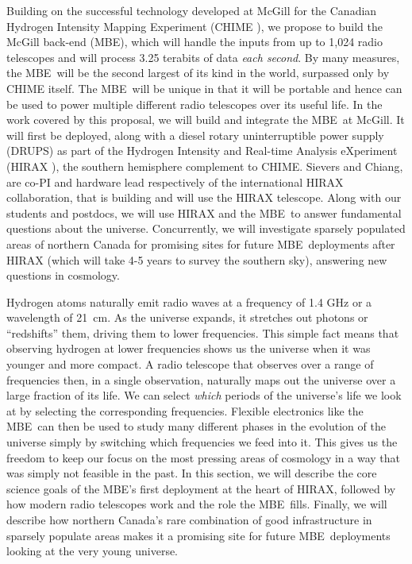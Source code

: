 \documentclass[letterpaper,11pt,preprint]{aastex}
\makeatletter
\newcommand{\mbe}{{\rm MBE}}
\def\section{\@startsection {section}{1}{\z@}{1.0ex plus 
1ex minus .2ex}{.2ex plus .2ex}{\large\bf}}
\makeatother
\begin{document}
Building on the successful technology developed at McGill for the
Canadian Hydrogen Intensity Mapping Experiment (CHIME
\citet{Bandura16}), we propose to build the McGill back-end (\mbe),
which will handle the inputs from up to 1,024 radio telescopes and
will process 3.25 terabits of data {\it{each second}}.  By many measures, the
\mbe\ will be the second largest of its kind in the world, surpassed
only by CHIME itself.  The \mbe\ will be unique in that it will be
portable and hence can be used to power multiple different radio
telescopes over its useful life. In the work covered by this proposal,
we will build and integrate the \mbe\ at McGill.  It will first be
deployed, along with a diesel rotary uninterruptible power supply
(DRUPS) as part of the Hydrogen Intensity and Real-time Analysis
eXperiment (HIRAX \citet{Newburgh16}), the southern hemisphere
complement to CHIME.
Sievers and Chiang, are co-PI and hardware lead respectively of the
international HIRAX collaboration, that is building and will use the
HIRAX telescope.  Along with our students and postdocs, we will use
HIRAX and the \mbe\ to answer fundamental questions about the
universe.
Concurrently, we will investigate sparsely populated areas of northern
Canada for promising sites for future \mbe\ deployments after HIRAX
(which will take 4-5 years to survey the southern sky),
answering new questions in cosmology.

\section{Research/Technology Development}

Hydrogen atoms naturally emit radio waves at a frequency of 1.4 GHz or
a wavelength of 21~cm.  As the universe expands, it stretches out
photons or ``redshifts'' them, driving them to lower frequencies.
This simple fact means that observing hydrogen at lower frequencies
shows us the universe when it was younger and more compact.  A radio
telescope that observes over a range of frequencies then, in a single
observation, naturally maps out the universe over a large fraction of
its life.  We can select {\it{which}} periods of the universe's life
we look at by selecting the corresponding frequencies.  Flexible
electronics like the \mbe\ can then be used to study many different
phases in the evolution of the universe simply by switching which
frequencies we feed into it.  This gives us the freedom to keep our
focus on the most pressing areas of cosmology in a way that was simply
not feasible in the past.  In this section, we will describe the core
science goals of the \mbe's first deployment at the heart of HIRAX,
followed by how modern radio telescopes work and the role the \mbe\ 
fills.  Finally, we will describe how northern Canada's rare
combination of good infrastructure in sparsely populate areas makes it
a promising site for future \mbe\ deployments looking at the very young
universe.
\end{document}
